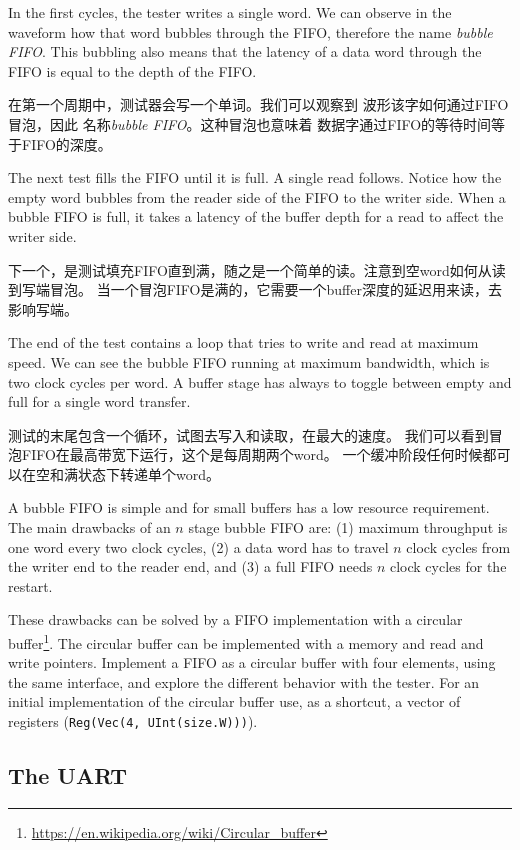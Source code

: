\documentclass[%
    10pt,
    headinclude, footexclude,
    openright, %
    notitlepage,
    cleardoubleempty,
    headsepline,
    pointlessnumbers,
    bibtotoc, idxtotoc,
    ]{scrbook}
\newcommand{\code}[1]{{\small{\texttt{#1}}}}
\newcommand{\myref}[2]{\href{#1}{#2}}
\renewcommand{\myref}[2]{{#2}{\footnote{\url{#1}}}}
\begin{document}
In the first cycles, the tester writes a single word. We can observe in
the waveform how that word bubbles through the FIFO, therefore the
name \emph{bubble FIFO}. This bubbling also means that the
latency of a data word through the FIFO is equal to the depth of the FIFO.

在第一个周期中，测试器会写一个单词。我们可以观察到
波形该字如何通过FIFO冒泡，因此
名称\emph{bubble FIFO}。这种冒泡也意味着
数据字通过FIFO的等待时间等于FIFO的深度。

The next test fills the FIFO until it is full. A single read follows.
Notice how the empty word bubbles from the reader side of the FIFO
to the writer side. When a bubble FIFO is full, it takes
a latency of the buffer depth for a read to affect the writer side. 

下一个，是测试填充FIFO直到满，随之是一个简单的读。注意到空word如何从读到写端冒泡。
当一个冒泡FIFO是满的，它需要一个buffer深度的延迟用来读，去影响写端。

The end of the test contains a loop that tries to write and read at maximum speed.
We can see the bubble FIFO running at maximum bandwidth, which is two
clock cycles per word. A buffer stage has always to toggle between empty
and full for a single word transfer.

测试的末尾包含一个循环，试图去写入和读取，在最大的速度。
我们可以看到冒泡FIFO在最高带宽下运行，这个是每周期两个word。
一个缓冲阶段任何时候都可以在空和满状态下转递单个word。

A bubble FIFO is simple and for small buffers has a low resource requirement.
The main drawbacks of an $n$ stage bubble FIFO are: (1) maximum throughput is
one word every two clock cycles, (2) a data word has to travel $n$ clock cycles
from the writer end to the reader end, and (3) a full FIFO needs $n$ clock cycles
for the restart.

These drawbacks can be solved by a FIFO implementation with a
\myref{https://en.wikipedia.org/wiki/Circular_buffer}{circular buffer}.
The circular buffer can be implemented with a memory and
read and write pointers.
Implement a FIFO as a circular buffer with four elements, using the same
interface, and explore the different behavior with the tester.
For an initial implementation of the circular buffer use, as a shortcut,
a vector of registers (\code{Reg(Vec(4, UInt(size.W)))}).

\subsection{The UART}
\end{document}
